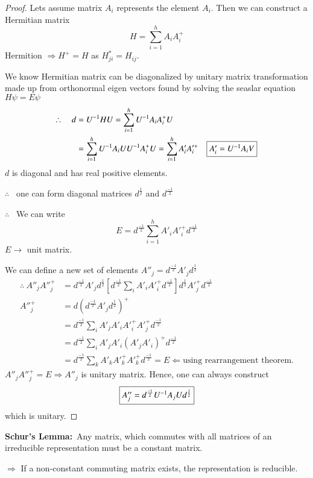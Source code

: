 \begin{proof}
Lets assume matrix $A_{i}$ represents the element $A_{i}$. Then we can construct a Hermitian matrix
$$
H=\sum\limits^{h}_{i=1}A_{i}A^{+}_{i}
$$
Hermition $\Rightarrow H^{+}=H$ as $H^{*}_{ji}=H_{ij}$.

We know Hermitian matrix can be diagonalized by unitary matrix transformation made up from orthonormal eigen vectors found by solving the seaslar equation $H\psi=E\psi$
\begin{align*}
\therefore\quad d &= U^{-1}HU=\sum\limits^{h}_{i=1}U^{-1}A_{i}A_{i}^{+}U\\
                  &= \sum\limits^{h}_{i=1}U^{-1}A_{i}UU^{-1}A_{i}^{+}U=\sum\limits^{h}_{i=1}A'_{i}A'^{+}_{i}\quad \fbox{$A'_{i}=U^{-1}A_{i}V$}
\end{align*}
$d$ is diagonal and has real positive elements.

$\therefore$ \ one can form diagonal matrices $d^{\frac{1}{2}}$ and $d^{\frac{-1}{2}}$ 

$\therefore$ \ We can write
$$
E=d^{\frac{-1}{2}}\sum\limits^{h}_{i=1}A'_{i}A'^{+}_{i}d^{\frac{-1}{2}}
$$
$E\to$ unit matrix.

We can define a new set of elements $A''_{j}=d^{\frac{-1}{2}}A'_{j}d^{\frac{1}{2}}$
\begin{align*}
\therefore~ A''_{j}A''^{+}_{j} &= d^{\frac{-1}{2}}A'_{j}d^{\frac{1}{2}}\left[d^{\frac{-1}{2}}\sum\limits_{i}A'_{i}A'^{+}_{i}d^{\frac{-1}{2}}\right]d^{\frac{1}{2}}A'^{+}_{j}d^{\frac{-1}{2}}\\
A''^{+}_{j} &= d\left(d^{\frac{-1}{2}}A'_{j}d^{\frac{1}{2}}\right)^{+}\\
&= d^{\frac{-1}{2}}\sum\limits_{i}A'_{j}A'_{i}A'^{+}_{i}A'^{+}_{j}d^{\frac{-1}{2}}\\
&= d^{\frac{-1}{2}}\sum\limits_{i}A'_{j}A'_{i}(A'_{j}A'_{i})^{+}d^{\frac{-1}{2}}\\
&= d^{\frac{-1}{2}}\sum\limits_{k}A'_{k}A'^{+}_{k}A'^{+}_{k}d^{\frac{-1}{2}}=E \Leftarrow \text{using rearrangement theorem.}
\end{align*}
$A''_{j}A''^{+}_{j}=E\Rightarrow A''_{j}$ is unitary matrix. Hence, one can always construct 
$$
\fbox{$A''_{j}=d^{\frac{-1}{2}}U^{-1}A_{j}U d^{\frac{1}{2}}$} 
$$
which is unitary.
\end{proof}

\noindent
{\bf Schur's Lemma:}~Any matrix, which commutes with all matrices of an irreducible representation must be a constant matrix.

$\Rightarrow$ If a non-constant commuting matrix exists, the representation is reducible.

